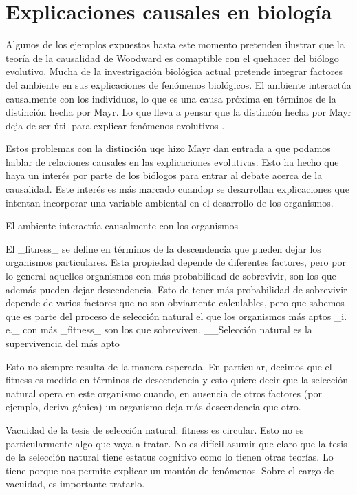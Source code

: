 \section{Explicaciones causales en biología}

Algunos de los ejemplos expuestos hasta este momento pretenden ilustrar que la teoría de la causalidad de Woodward es comaptible con el quehacer del biólogo evolutivo. Mucha de la investrigación biológica actual pretende integrar factores del ambiente en sus explicaciones de fenómenos biológicos. El ambiente interactúa causalmente con los individuos, lo que es una causa próxima en términos de la distinción hecha por Mayr. Lo que lleva a pensar que la distincón hecha por Mayr deja de ser útil para explicar fenómenos evolutivos \cite{Uller2020, Dayan2020, Laland2011}.

Estos problemas con la distinción uqe hizo Mayr dan entrada a que podamos hablar de relaciones causales en las explicaciones evolutivas. Esto ha hecho que haya un interés por parte de los biólogos para entrar al debate acerca de la causalidad. Este interés es más marcado cuandop se desarrollan explicaciones que intentan incorporar una variable ambiental en el desarrollo de los organismos.

El ambiente interactúa causalmente con los organismos

El _fitness_ se define en términos de la descendencia que pueden dejar los organismos particulares. Esta propiedad depende de diferentes factores, pero por lo general aquellos organismos con más probabilidad de sobrevivir, son los que además pueden dejar descendencia. Esto de tener más probabilidad de sobrevivir depende de varios factores que no son obviamente calculables, pero que sabemos que es parte del proceso de selección natural el que los organismos más aptos _i. e._ con más _fitness_ son los que sobreviven. __Selección natural es la supervivencia del más apto__

Esto no siempre resulta de la manera esperada. En particular, decimos que el fitness es medido en términos de descendencia y esto quiere decir que la selección natural opera en este organismo cuando, en ausencia de otros factores (por ejemplo, deriva génica) un organismo deja más descendencia que otro.

Vacuidad  de la tesis de selección natural: fitness es circular. Esto no es particularmente algo que vaya a tratar. No es difícil asumir que claro que la tesis de la selección natural tiene estatus cognitivo como lo tienen otras teorías. Lo tiene porque nos permite explicar un montón de fenómenos. Sobre el cargo de vacuidad, es importante tratarlo.

